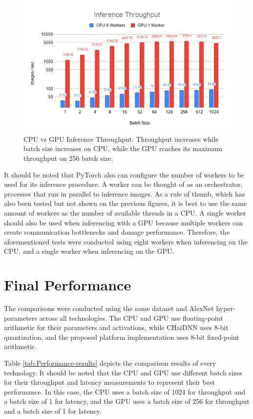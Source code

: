 \begin{figure} [H]
	\centering
	\includegraphics[width=\textwidth]{../Images/Results/CPU-GPU-Inference-Throughput.png}
	\decoRule
	\caption[CPU vs GPU Inference Throughput]{CPU vs GPU Inference Throughput: Throughput increases while batch size increases on CPU, while the GPU reaches its maximum throughput on 256 batch size.}
	\label{fig:CPU-vs-GPU-Inference-Throughput}
\end{figure}

It should be noted that PyTorch also can configure the number of workers to be used for its inference procedure. A worker can be thought of as an orchestrator, processes that run in parallel to inference images. As a rule of thumb, which has also been tested but not shown on the previous figures, it is best to use the same amount of workers as the number of available threads in a CPU. A single worker should also be used when inferencing with a GPU because multiple workers can create communication bottlenecks and damage performance. Therefore, the aforementioned tests were conducted using eight workers when inferencing on the CPU, and a single worker when inferencing on the GPU.

\section{Final Performance}
The comparisons were conducted using the same dataset and AlexNet hyper-parameters across all technologies. The CPU and GPU use floating-point arithmetic for their parameters and activations, while CHaiDNN uses 8-bit quantization, and the proposed platform implementation uses 8-bit fixed-point arithmetic.

Table \ref{tab:Performance-results} depicts the comparison results of every technology. It should be noted that the CPU and GPU use different batch sizes for their throughput and latency measurements to represent their best performance. In this case, the CPU uses a batch size of 1024 for throughput and a batch size of 1 for latency, and the GPU uses a batch size of 256 for throughput and a batch size of 1 for latency.

